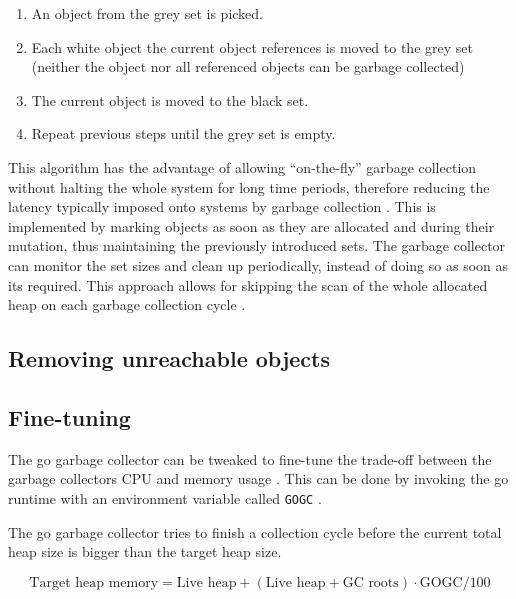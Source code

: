 \begin{enumerate}
    \item An object from the grey set is picked.
    \item Each white object the current object references is moved to the grey
        set (neither the object nor all referenced objects can be garbage
        collected) 
    \item The current object is moved to the black set.
    \item Repeat previous steps until the grey set is empty.
\end{enumerate}

This algorithm has the advantage of allowing ``on-the-fly'' garbage collection
without halting the whole system for long time periods, therefore reducing the
latency typically imposed onto systems by garbage collection
\cite[Abstract]{dijkstra-gc-1978}. This is implemented by marking objects as
soon as they are allocated and during their mutation, thus maintaining the
previously introduced sets. The garbage collector can monitor the set sizes and
clean up periodically, instead of doing so as soon as its required. This
approach allows for skipping the scan of the whole allocated heap on each
garbage collection cycle \cite[6. A Fine-Grained Solution]{dijkstra-gc-1978}.

\subsection{Removing unreachable objects}

\subsection{Fine-tuning}

The go garbage collector can be tweaked to fine-tune the trade-off between the
garbage collectors CPU and memory usage \cite[The GC
cycle]{go_gcguide_2022}. This can be done by invoking the go runtime with an
environment variable called \texttt{GOGC} \cite[GOGC]{go_gcguide_2022}.

The go garbage collector tries to finish a collection cycle before the current
total heap size is bigger than the target heap size.

\begin{equation}
    \textrm{Target heap memory} = \textrm{Live heap} + \left(\textrm{Live heap} + \textrm{GC roots}\right) \cdot \textrm{GOGC} / 100
\end{equation}

